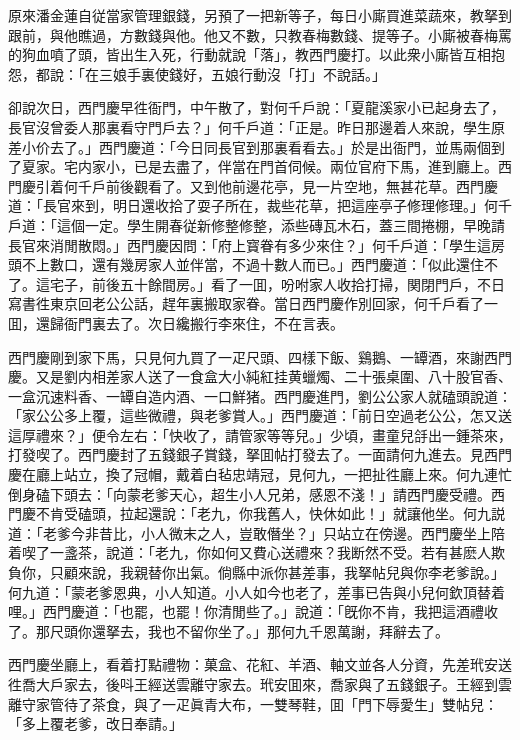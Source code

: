 原來潘金蓮自従當家管理銀錢，另預了一把新等子，每日小廝買進菜蔬來，教拏到跟前，與他瞧過，方數錢與他。他又不數，只教春梅數錢、提等子。小廝被春梅罵的狗血噴了頭，皆出生入死，行動就說「落」，教西門慶打。以此衆小廝皆互相抱怨，都說：「在三娘手裏使錢好，五娘行動沒「打」不說話。」

卻說次日，西門慶早徃衙門，中午散了，對何千戶說：「夏龍溪家小已起身去了，長官沒曾委人那裏看守門戶去？」何千戶道：「正是。昨日那邊着人來說，學生原差小价去了。」西門慶道：「今日同長官到那裏看看去。」於是出衙門，並馬兩個到了夏家。宅内家小，已是去盡了，伴當在門首伺候。兩位官府下馬，進到廳上。西門慶引着何千戶前後觀看了。又到他前邊花亭，見一片空地，無甚花草。西門慶道：「長官來到，明日還收拾了耍子所在，裁些花草，把這座亭子修理修理。」何千戶道：「這個一定。學生開春従新修整修整，添些磚瓦木石，蓋三間捲棚，早晚請長官來消閒散悶。」西門慶因問：「府上寳眷有多少來住？」何千戶道：「學生這房頭不上數口，還有幾房家人並伴當，不過十數人而已。」西門慶道：「似此還住不了。這宅子，前後五十餘間房。」看了一囬，吩咐家人收拾打掃，関閉門戶，不日寫書徃東京回老公公話，趕年裏搬取家眷。當日西門慶作別回家，何千戶看了一囬，還歸衙門裏去了。次日纔搬行李來住，不在言表。

西門慶剛到家下馬，只見何九買了一疋尺頭、四樣下飯、鷄鵝、一罈酒，來謝西門慶。又是劉内相差家人送了一食盒大小純紅挂黄蠟燭、二十張桌圍、八十股官香、一盒沉速料香、一罈自造内酒、一口鮮猪。西門慶進門，劉公公家人就磕頭說道：「家公公多上覆，這些微禮，與老爹賞人。」西門慶道：「前日空過老公公，怎又送這厚禮來？」便令左右：「快收了，請管家等等兒。」少頃，畫童兒㧱出一鍾茶來，打發喫了。西門慶封了五錢銀子賞錢，拏囬帖打發去了。一面請何九進去。見西門慶在廳上站立，換了冠帽，戴着白毡忠靖冠，見何九，一把扯徃廳上來。何九連忙倒身磕下頭去：「向蒙老爹天心，超生小人兄弟，感恩不淺！」請西門慶受禮。西門慶不肯受磕頭，拉起還說：「老九，你我舊人，快休如此！」就讓他坐。何九説道：「老爹今非昔比，小人微末之人，豈敢僭坐？」只站立在傍邊。西門慶坐上陪着喫了一盞茶，說道：「老九，你如何又費心送禮來？我断然不受。若有甚麽人欺負你，只顧來說，我親替你出氣。倘縣中派你甚差事，我拏帖兒與你李老爹說。」何九道：「蒙老爹恩典，小人知道。小人如今也老了，差事已告與小兒何欽頂替着哩。」西門慶道：「也罷，也罷！你清閒些了。」說道：「旣你不肯，我把這酒禮收了。那尺頭你還拏去，我也不留你坐了。」那何九千恩萬謝，拜辭去了。

西門慶坐廳上，看着打點禮物：菓盒、花紅、羊酒、軸文並各人分資，先差玳安送徃喬大戶家去，後呌王經送雲離守家去。玳安囬來，喬家與了五錢銀子。王經到雲離守家管待了茶食，與了一疋眞青大布，一雙琴鞋，囬「門下辱愛生」雙帖兒：「多上覆老爹，改日奉請。」

